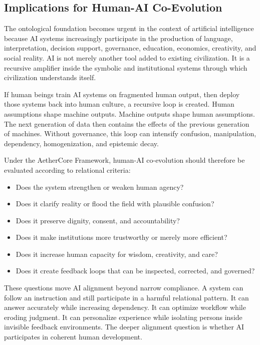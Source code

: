 \documentclass[12pt]{article}
\begin{document}
\subsection{Implications for Human-AI Co-Evolution}

The ontological foundation becomes urgent in the context of artificial intelligence because AI systems increasingly participate in the production of language, interpretation, decision support, governance, education, economics, creativity, and social reality. AI is not merely another tool added to existing civilization. It is a recursive amplifier inside the symbolic and institutional systems through which civilization understands itself.

If human beings train AI systems on fragmented human output, then deploy those systems back into human culture, a recursive loop is created. Human assumptions shape machine outputs. Machine outputs shape human assumptions. The next generation of data then contains the effects of the previous generation of machines. Without governance, this loop can intensify confusion, manipulation, dependency, homogenization, and epistemic decay.

Under the AetherCore Framework, human-AI co-evolution should therefore be evaluated according to relational criteria:

\begin{itemize}
  \item Does the system strengthen or weaken human agency?
  \item Does it clarify reality or flood the field with plausible confusion?
  \item Does it preserve dignity, consent, and accountability?
  \item Does it make institutions more trustworthy or merely more efficient?
  \item Does it increase human capacity for wisdom, creativity, and care?
  \item Does it create feedback loops that can be inspected, corrected, and governed?
\end{itemize}

These questions move AI alignment beyond narrow compliance. A system can follow an instruction and still participate in a harmful relational pattern. It can answer accurately while increasing dependency. It can optimize workflow while eroding judgment. It can personalize experience while isolating persons inside invisible feedback environments. The deeper alignment question is whether AI participates in coherent human development.
\end{document}
